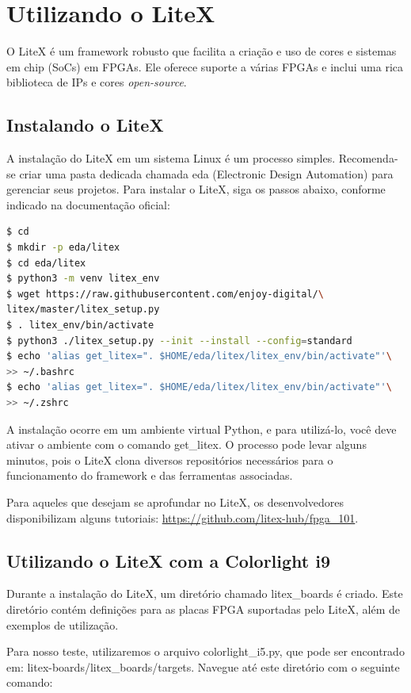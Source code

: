 \documentclass{report}
\begin{document}
\section{Utilizando o LiteX}

O LiteX é um framework robusto que facilita a criação e uso de cores e sistemas em chip (SoCs) em FPGAs. Ele oferece suporte a várias FPGAs e inclui uma rica biblioteca de IPs e cores \textit{open-source}.

\subsection{Instalando o LiteX}

A instalação do LiteX em um sistema Linux é um processo simples. Recomenda-se criar uma pasta dedicada chamada eda (Electronic Design Automation) para gerenciar seus projetos. Para instalar o LiteX, siga os passos abaixo, conforme indicado na documentação oficial:

\begin{lstlisting}[language=bash]
$ cd
$ mkdir -p eda/litex
$ cd eda/litex
$ python3 -m venv litex_env
$ wget https://raw.githubusercontent.com/enjoy-digital/\
litex/master/litex_setup.py
$ . litex_env/bin/activate
$ python3 ./litex_setup.py --init --install --config=standard
$ echo 'alias get_litex=". $HOME/eda/litex/litex_env/bin/activate"'\
>> ~/.bashrc
$ echo 'alias get_litex=". $HOME/eda/litex/litex_env/bin/activate"'\
>> ~/.zshrc
\end{lstlisting}

A instalação ocorre em um ambiente virtual Python, e para utilizá-lo, você deve ativar o ambiente com o comando get\_litex. O processo pode levar alguns minutos, pois o LiteX clona diversos repositórios necessários para o funcionamento do framework e das ferramentas associadas.

Para aqueles que desejam se aprofundar no LiteX, os desenvolvedores disponibilizam alguns tutoriais: \url{https://github.com/litex-hub/fpga_101}.

\subsection{Utilizando o LiteX com a Colorlight i9}

Durante a instalação do LiteX, um diretório chamado litex\_boards é criado. Este diretório contém definições para as placas FPGA suportadas pelo LiteX, além de exemplos de utilização.

Para nosso teste, utilizaremos o arquivo colorlight\_i5.py, que pode ser encontrado em: litex-boards/litex\_boards/targets. Navegue até este diretório com o seguinte comando:
\end{document}
